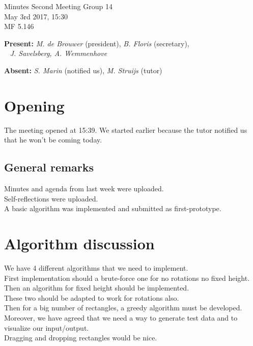 \documentclass[a4paper,twoside,11pt]{article}
\title{}
\date{}
\begin{document}

\begin{center}
\Huge{Minutes Second Meeting Group 14}
\\\vspace*{2mm}
\Large{May 3rd 2017, 15:30}
\\\vspace*{2mm}
\large{MF 5.146}
\\
		\end{center}

		\textbf{Present:} \textit{M. de Brouwer} (president), \textit{B. Floris} (secretary), 
\\\indent\qquad\,\,\,\,\,\qquad\quad \textit{J. Savelsberg, A. Wemmenhove}
		
		\textbf{Absent:} \textit{S. Marin} (notified us), \textit{M. Struijs} (tutor)

	\section{Opening}
	
	The meeting opened at 15:39. We started earlier because the tutor notified us that he won't be coming today.
	
	\subsection{General remarks}
	
	Minutes and agenda from last week were uploaded. \\
	Self-reflections were uploaded. \\
	A basic algorithm was implemented and submitted as first-prototype.
	
	\section{Algorithm discussion}
	
	We have 4 different algorithms that we need to implement. \\
	First implementation should a brute-force one for no rotations no fixed height. \\
	Then an algorithm for fixed height should be implemented. \\
	These two should be adapted to work for rotations also. \\
	Then for a big number of rectangles, a greedy algorithm must be developed. \\
	Moreover, we have agreed that we need a way to generate test data and to visualize our input/output. \\
	Dragging and dropping rectangles would be nice. 
	
\end{document}
